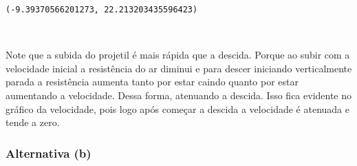 \documentclass[12pt, a4paper]{article}
\makeatletter
\newcommand{\boxspacing}{\kern\kvtcb@left@rule\kern\kvtcb@boxsep}
\newcommand{\prompt}[4]{
        {\ttfamily\llap{{\color{#2}[#3]:\hspace{3pt}#4}}\vspace{-\baselineskip}}
    }
\makeatother
\begin{document}
            \begin{tcolorbox}[breakable, size=fbox, boxrule=.5pt, pad at break*=1mm, opacityfill=0]
\prompt{Out}{outcolor}{22}{\boxspacing}
\begin{Verbatim}[commandchars=\\\{\}]
(-9.39370566201273, 22.213203435596423)
\end{Verbatim}
\end{tcolorbox}
        
    \begin{center}
    \end{center}
    { \hspace*{\fill} \\}
    
    Note que a subida do projetil é mais rápida que a descida. Porque ao
subir com a velocidade inicial a resistência do ar diminui e para descer
iniciando verticalmente parada a resistência aumenta tanto por estar
caindo quanto por estar aumentando a velocidade. Dessa forma, atenuando
a descida. Isso fica evidente no gráfico da velocidade, pois logo após
começar a descida a velocidade é atenuada e tende a zero.

    \hypertarget{alternativa-b}{%
\subsubsection{Alternativa (b)}\label{alternativa-b}}
\end{document}
